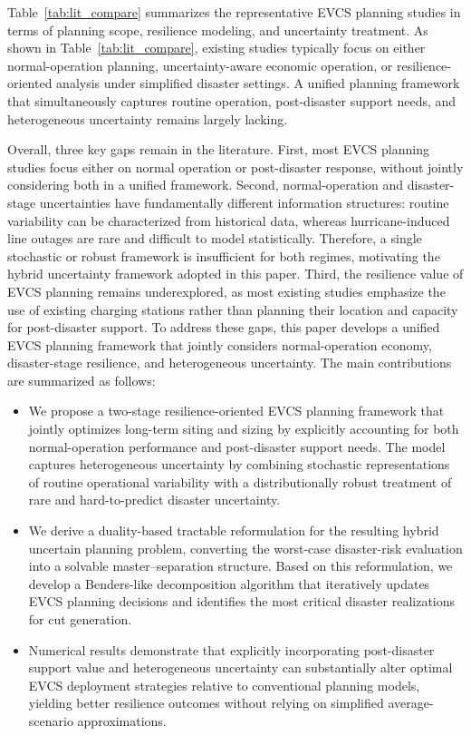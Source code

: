 \documentclass[journal]{IEEEtran}
\providecommand{\1}{\mathbf{1}}
\begin{document}
Table~\ref{tab:lit_compare} summarizes the representative EVCS planning studies in terms of planning scope, resilience modeling, and uncertainty treatment. As shown in Table~\ref{tab:lit_compare}, existing studies typically focus on either normal-operation planning, uncertainty-aware economic operation, or resilience-oriented analysis under simplified disaster settings. A unified planning framework that simultaneously captures routine operation, post-disaster support needs, and heterogeneous uncertainty remains largely lacking.

Overall, three key gaps remain in the literature. First, most EVCS planning studies focus either on normal operation or post-disaster response, without jointly considering both in a unified framework. Second, normal-operation and disaster-stage uncertainties have fundamentally different information structures: routine variability can be characterized from historical data, whereas hurricane-induced line outages are rare and difficult to model statistically. Therefore, a single stochastic or robust framework is insufficient for both regimes, motivating the hybrid uncertainty framework adopted in this paper. Third, the resilience value of EVCS planning remains underexplored, as most existing studies emphasize the use of existing charging stations rather than planning their location and capacity for post-disaster support. To address these gaps, this paper develops a unified EVCS planning framework that jointly considers normal-operation economy, disaster-stage resilience, and heterogeneous uncertainty. The main contributions are summarized as follows:
 
\begin{itemize}
    \item We propose a two-stage resilience-oriented EVCS planning framework that jointly optimizes long-term siting and sizing by explicitly accounting for both normal-operation performance and post-disaster support needs. The model captures heterogeneous uncertainty by combining stochastic representations of routine operational variability with a distributionally robust treatment of rare and hard-to-predict disaster uncertainty.
    \item We derive a duality-based tractable reformulation for the resulting hybrid uncertain planning problem, converting the worst-case disaster-risk evaluation into a solvable master–separation structure. Based on this reformulation, we develop a Benders-like decomposition algorithm that iteratively updates EVCS planning decisions and identifies the most critical disaster realizations for cut generation.
    \item Numerical results demonstrate that explicitly incorporating post-disaster support value and heterogeneous uncertainty can substantially alter optimal EVCS deployment strategies relative to conventional planning models, yielding better resilience outcomes without relying on simplified average-scenario approximations.
\end{itemize}
\end{document}
